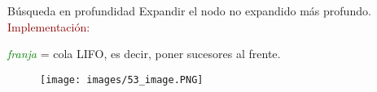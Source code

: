 \begin{frame}{Búsqueda en profundidad}
Expandir el nodo no expandido más profundo.\\
\textcolor{DarkRed}{Implementación:}
\begin{center}
    \textit{\textcolor{Green}{franja}} = cola LIFO, es decir, poner sucesores al
    frente.\\
\end{center}
\begin{figure}
    \centering
    \texttt{[image: images/53\_image.PNG]}
\end{figure}
\end{frame}{}
